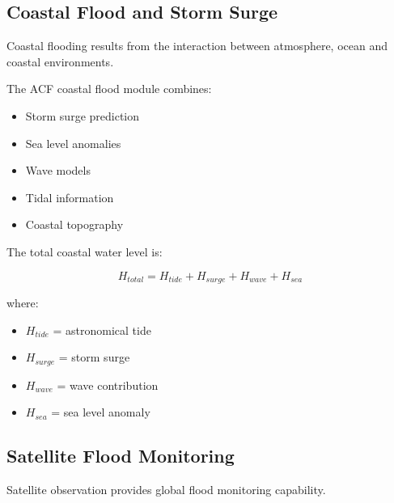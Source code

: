 
\subsection{Coastal Flood and Storm Surge}

Coastal flooding results from the interaction between atmosphere,
ocean and coastal environments.

The ACF coastal flood module combines:

\begin{itemize}

\item Storm surge prediction

\item Sea level anomalies

\item Wave models

\item Tidal information

\item Coastal topography

\end{itemize}


The total coastal water level is:

\[
H_{total}
=
H_{tide}
+
H_{surge}
+
H_{wave}
+
H_{sea}
\]


where:

\begin{itemize}

\item $H_{tide}$ = astronomical tide

\item $H_{surge}$ = storm surge

\item $H_{wave}$ = wave contribution

\item $H_{sea}$ = sea level anomaly

\end{itemize}



\subsection{Satellite Flood Monitoring}

Satellite observation provides global flood monitoring capability.

